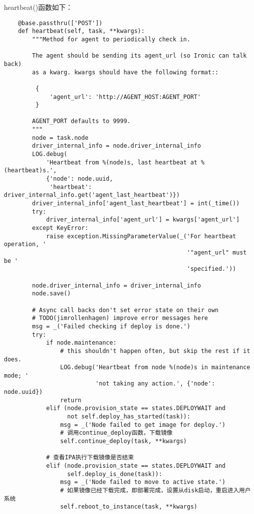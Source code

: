 \documentclass[a4paper,left=1.5cm,right=1.5cm,11pt]{article}
\begin{document}
	heartbeat()函数如下：
	\begin{lstlisting}
	@base.passthru(['POST'])
    def heartbeat(self, task, **kwargs):
        """Method for agent to periodically check in.

        The agent should be sending its agent_url (so Ironic can talk back)
        as a kwarg. kwargs should have the following format::

         {
             'agent_url': 'http://AGENT_HOST:AGENT_PORT'
         }

        AGENT_PORT defaults to 9999.
        """
        node = task.node
        driver_internal_info = node.driver_internal_info
        LOG.debug(
            'Heartbeat from %(node)s, last heartbeat at %(heartbeat)s.',
            {'node': node.uuid,
             'heartbeat': driver_internal_info.get('agent_last_heartbeat')})
        driver_internal_info['agent_last_heartbeat'] = int(_time())
        try:
            driver_internal_info['agent_url'] = kwargs['agent_url']
        except KeyError:
            raise exception.MissingParameterValue(_('For heartbeat operation, '
                                                    '"agent_url" must be '
                                                    'specified.'))

        node.driver_internal_info = driver_internal_info
        node.save()

        # Async call backs don't set error state on their own
        # TODO(jimrollenhagen) improve error messages here
        msg = _('Failed checking if deploy is done.')
        try:
            if node.maintenance:
                # this shouldn't happen often, but skip the rest if it does.
                LOG.debug('Heartbeat from node %(node)s in maintenance mode; '
                          'not taking any action.', {'node': node.uuid})
                return
            elif (node.provision_state == states.DEPLOYWAIT and
                  not self.deploy_has_started(task)):
                msg = _('Node failed to get image for deploy.')
				# 调用continue_deploy函数，下载镜像
                self.continue_deploy(task, **kwargs)         

			# 查看IPA执行下载镜像是否结束
            elif (node.provision_state == states.DEPLOYWAIT and
                  self.deploy_is_done(task)):             
                msg = _('Node failed to move to active state.')
				# 如果镜像已经下载完成，即部署完成，设置从disk启动，重启进入用户系统
                self.reboot_to_instance(task, **kwargs)


\end{lstlisting}
\end{document}
